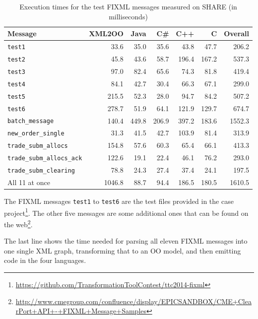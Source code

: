 \documentclass[a4paper]{article}
\begin{document}
\begin{table}[h!t]
  \centering
  \begin{tabular}{| l | r | r | r | r | r | r |}
    \hline
    \textbf{Message} & \textbf{XML2OO} & \textbf{Java} & \textbf{C\#} & \textbf{C++} & \textbf{C} & \textbf{Overall}\\
    \hline
    \texttt{test1}                    & 33.6  & 35.0  & 35.6  & 43.8 & 47.7 & 206.2\\
    \texttt{test2}                    & 45.8  & 43.6 & 58.7 & 196.4 & 167.2 & 537.3\\
    \texttt{test3}                    & 97.0  & 82.4 & 65.6 & 74.3 & 81.8 & 419.4\\
    \texttt{test4}                    & 84.1  & 42.7 & 30.4 & 66.3 & 67.1 & 299.0\\
    \texttt{test5}                    & 215.5  & 52.3 & 28.0 & 94.7 & 84.2 & 507.2\\
    \texttt{test6}                    & 278.7  & 51.9 & 64.1 & 121.9 & 129.7 & 674.7\\
    \hline
    \texttt{batch\_message}           & 140.4  & 449.8 & 206.9 & 397.2 & 183.6 & 1552.3\\
    \texttt{new\_order\_single}       & 31.3  & 41.5  & 42.7  & 103.9 & 81.4 & 313.9\\
    \texttt{trade\_subm\_allocs}      & 154.8  & 57.6  & 60.3  & 65.4 & 66.1 & 413.3\\
    \texttt{trade\_subm\_allocs\_ack} & 122.6  & 19.1 & 22.4 & 46.1 & 76.2 & 293.0\\
    \texttt{trade\_subm\_clearing}    & 78.8  & 24.3  & 27.4  & 37.4 & 24.1 & 197.5\\
    \hline
    All 11 at once                    & 1046.8 & 88.7 & 94.4 & 186.5 & 180.5 & 1610.5\\
    \hline
  \end{tabular}
  \caption{Execution times for the test FIXML messages measured on SHARE (in milliseconds)}
  \label{tab:exec-times}
\end{table}

The FIXML messages \texttt{test1} to \texttt{test6} are the test files provided
in the case
project\footnote{\url{https://github.com/TransformationToolContest/ttc2014-fixml}}.
The other five messages are some additional ones that can be found on the
web\footnote{\url{http://www.cmegroup.com/confluence/display/EPICSANDBOX/CME+ClearPort+API+-+FIXML+Message+Samples}}.

The last line shows the time needed for parsing all eleven FIXML messages into
one single XML graph, transforming that to an OO model, and then emitting code
in the four languages.
\end{document}
